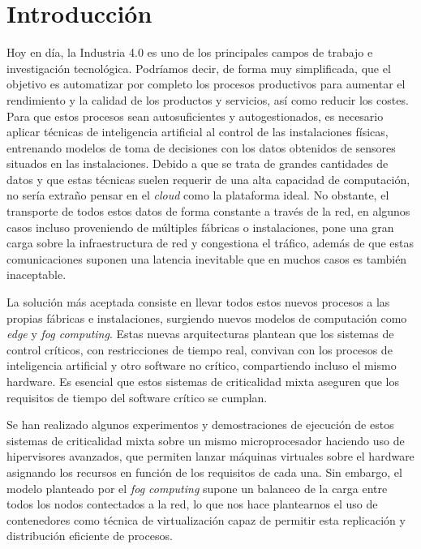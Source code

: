 \section{Introducción}

Hoy en día, la Industria 4.0 es uno de los principales campos de trabajo e
investigación tecnológica. Podríamos decir, de forma muy simplificada, que el
objetivo es automatizar por completo los procesos productivos para aumentar el
rendimiento y la calidad de los productos y servicios, así como reducir los
costes. Para que estos procesos sean autosuficientes y autogestionados, es
necesario aplicar técnicas de inteligencia artificial al control de las
instalaciones físicas, entrenando modelos de toma de decisiones con los datos
obtenidos de sensores situados en las instalaciones. Debido a que se trata de
grandes cantidades de datos y que estas técnicas suelen requerir de una alta
capacidad de computación, no sería extraño pensar en el \textit{cloud} como la
plataforma ideal. No obstante, el transporte de todos estos datos de forma
constante a través de la red, en algunos casos incluso proveniendo de múltiples
fábricas o instalaciones, pone una gran carga sobre la infraestructura de red y
congestiona el tráfico, además de que estas comunicaciones suponen una latencia
inevitable que en muchos casos es también inaceptable.

La solución más aceptada consiste en llevar todos estos nuevos procesos a las
propias fábricas e instalaciones, surgiendo nuevos modelos de computación como
\textit{edge} y \textit{fog computing}. Estas nuevas arquitecturas plantean que
los sistemas de control críticos, con restricciones de tiempo real, convivan con
los procesos de inteligencia artificial y otro software no crítico, compartiendo
incluso el mismo hardware. Es esencial que estos sistemas de criticalidad mixta
aseguren que los requisitos de tiempo del software crítico se cumplan.

Se han realizado algunos experimentos y demostraciones de ejecución de estos
sistemas de criticalidad mixta sobre un mismo microprocesador haciendo uso de
hipervisores avanzados, que permiten lanzar máquinas virtuales sobre el hardware
asignando los recursos en función de los requisitos de cada una. Sin embargo, el
modelo planteado por el \textit{fog computing} supone un balanceo de la carga
entre todos los nodos contectados a la red, lo que nos hace plantearnos el uso
de contenedores como técnica de virtualización capaz de permitir esta
replicación y distribución eficiente de procesos.

